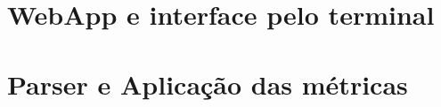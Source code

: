 \documentclass[english,a4paper]{report}
\begin{document}
\part{WebApp e interface pelo terminal}

\newpage

\newpage

\newpage
\part{Parser e Aplicação das métricas}

\newpage

\newpage

\newpage

\newpage


{}

\appendix
\newpage


\end{document}
